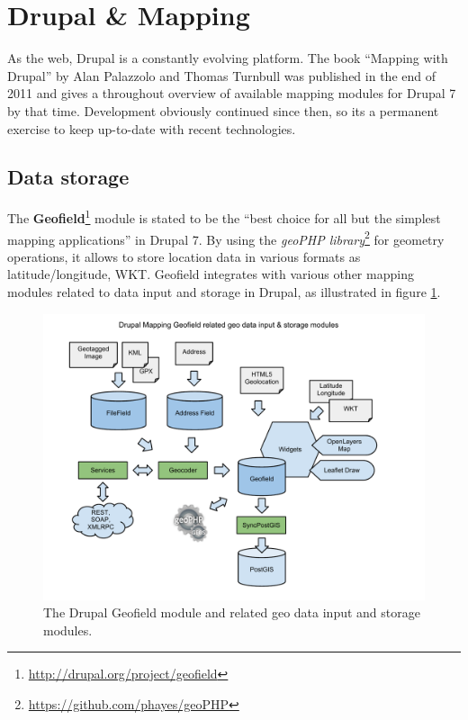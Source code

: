 
%
%

\section{Drupal \& Mapping}
\label{chapter:drupal-mapping}

As the web, Drupal is a constantly evolving platform. The book ``Mapping with Drupal''\cite{Zzolo11mappingdrupal} by Alan Palazzolo and Thomas Turnbull was published in the end of 2011 and gives a throughout overview of available mapping modules for Drupal 7 by that time. Development obviously continued since then, so its a permanent exercise to keep up-to-date with recent technologies.

\subsection{Data storage}

The \textbf{Geofield}\footnote{\url{http://drupal.org/project/geofield}} module is stated to be the ``best choice for all but the simplest mapping applications''\cite[page 27]{Zzolo11mappingdrupal} in Drupal 7. By using the \textit{geoPHP library}\footnote{\url{https://github.com/phayes/geoPHP}} for geometry operations, it allows to store location data in various formats as latitude/longitude, WKT. Geofield integrates with various other mapping modules related to data input and storage in Drupal, as illustrated in figure \ref{fig:geofield}.

\begin{figure}[h]
  \begin{center}
    \includegraphics[width=1.2\textwidth]{figures/drupal_mapping_geofield.pdf}
    \caption{The Drupal Geofield module and related geo data input and storage modules.}
    \label{fig:geofield}
  \end{center}
\end{figure}

